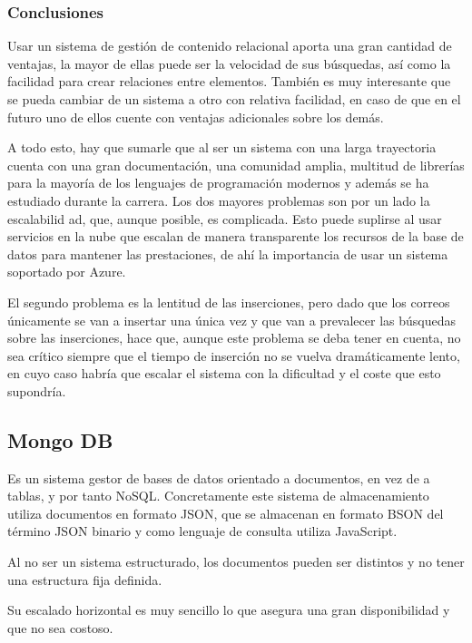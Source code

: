 \subsubsection{Conclusiones}

Usar un sistema de gestión de contenido relacional aporta una gran cantidad de ventajas, la mayor de ellas puede ser la velocidad de sus búsquedas, así como la facilidad para crear relaciones entre elementos. También es muy interesante que se pueda cambiar de un sistema a otro con relativa facilidad, en caso de que en el futuro uno de ellos cuente con ventajas adicionales sobre los demás. 

A todo esto, hay que sumarle que al ser un sistema con una larga trayectoria cuenta con una gran documentación, una comunidad amplia, multitud de librerías para la mayoría de los lenguajes de programación modernos y además se ha estudiado durante la carrera.
Los dos mayores problemas son por un lado la escalabilid
ad, que, aunque posible, es complicada. Esto puede suplirse al usar servicios en la nube que escalan de manera transparente los recursos de la base de datos para mantener las prestaciones, de ahí la importancia de usar un sistema soportado por Azure. 

El segundo problema es la lentitud de las inserciones, pero dado que los correos únicamente se van a insertar una única vez y que van a prevalecer las búsquedas sobre las inserciones, hace que, aunque este problema se deba tener en cuenta, no sea crítico siempre que el tiempo de inserción no se vuelva dramáticamente lento, en cuyo caso habría que escalar el sistema con la dificultad y el coste que esto supondría.

\subsection{Mongo DB}
Es un sistema gestor de bases de datos orientado a documentos, en vez de a tablas, y por tanto NoSQL. Concretamente este sistema de almacenamiento utiliza documentos en formato JSON, que se almacenan en formato BSON del término JSON binario y como lenguaje de consulta utiliza JavaScript.

Al no ser un sistema estructurado, los documentos pueden ser distintos y no tener una estructura fija definida. 

Su escalado horizontal es muy sencillo lo que asegura una gran disponibilidad y que no sea costoso. 
